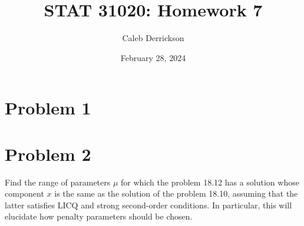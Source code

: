 

\title{STAT 31020: Homework 7}
\author{Caleb Derrickson}
\date{February 28, 2024}


\onehalfspacing
\maketitle
\allowdisplaybreaks

\tableofcontents

\newpage
\section{Problem 1}


\newpage
\section{Problem 2}
Find the range of parameters $\mu$ for which the problem 18.12 has a solution whose component $x$ is the same as the solution of the problem 18.10, assuming that the latter satisfies LICQ and strong second-order conditions. In particular, this will elucidate how penalty parameters should be chosen. 
\partbreak

